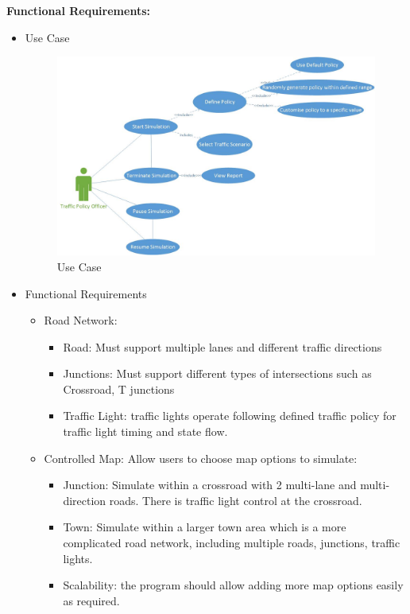 \documentclass[11pt]{article}
\begin{document}
    {\bf{Functional Requirements:}} \newline
    \begin{itemize}
        \item Use Case
        \begin{figure}[h]
        \includegraphics[width=16cm]{usecase} \caption{Use Case} \label{uc}
        \end{figure}
        \item Functional Requirements 
        \begin{itemize}
            \item Road Network:
                \begin{itemize}
                    \item Road: Must support multiple lanes and different traffic directions 
                    \item Junctions: Must support different types of intersections such as Crossroad, T junctions 
                    \item Traffic Light: traffic lights operate following  defined traffic policy for traffic light timing and state flow.
                    
                    
                    
                \end{itemize}
            \item Controlled Map: Allow users to choose map options to simulate:
                 \begin{itemize}[noitemsep]
	                    \item Junction: Simulate within a crossroad with 2 multi-lane and multi-direction roads. There is traffic light control at the crossroad.
	                    \item Town: Simulate within a larger town area which is a more complicated road network, including multiple roads, junctions, traffic lights. 
	                    \item Scalability: the program should allow adding more map options easily as required. 
                    	

\end{itemize}
\end{itemize}
\end{itemize}
\end{document}
